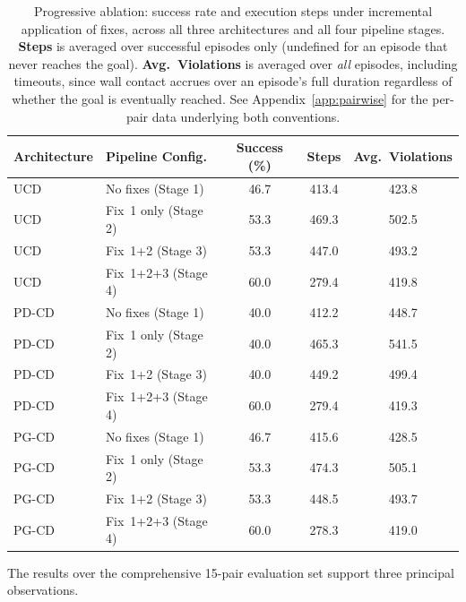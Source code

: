 \documentclass[12pt, a4paper, oneside]{report}
\theoremstyle{definition}
\begin{document}
\begin{table}[H]
\centering
\caption{Progressive ablation: success rate and execution
  steps under incremental application of fixes, across all three
  architectures and all four pipeline stages.
  \textbf{Steps} is averaged over successful episodes only
  (undefined for an episode that never reaches the goal).
  \textbf{Avg.\ Violations} is averaged over \emph{all} episodes,
  including timeouts, since wall contact accrues over an episode's
  full duration regardless of whether the goal is eventually
  reached. See Appendix~\ref{app:pairwise} for the per-pair data
  underlying both conventions.}
\label{tab:ablation_progressive}
\begin{tabular}{@{}llccc@{}}
\toprule
\textbf{Architecture} & \textbf{Pipeline Config.} &
\textbf{Success (\%)} & \textbf{Steps} &
\textbf{Avg.\ Violations} \\
\midrule
UCD   & No fixes (Stage 1)  & 46.7  & 413.4 & 423.8 \\
UCD   & Fix~1 only (Stage 2)& 53.3  & 469.3 & 502.5 \\
UCD   & Fix~1+2 (Stage 3)   & 53.3  & 447.0 & 493.2 \\
UCD   & Fix~1+2+3 (Stage 4) & 60.0  & 279.4 & 419.8 \\
\midrule
PD-CD & No fixes (Stage 1)  & 40.0  & 412.2 & 448.7 \\
PD-CD & Fix~1 only (Stage 2)& 40.0  & 465.3 & 541.5 \\
PD-CD & Fix~1+2 (Stage 3)   & 40.0  & 449.2 & 499.4 \\
PD-CD & Fix~1+2+3 (Stage 4) & 60.0  & 279.4 & 419.3 \\
\midrule
PG-CD & No fixes (Stage 1)& 46.7  & 415.6 & 428.5 \\
PG-CD & Fix~1 only (Stage 2)& 53.3  & 474.3 & 505.1 \\
PG-CD & Fix~1+2 (Stage 3) & 53.3  & 448.5 & 493.7 \\
PG-CD & Fix~1+2+3 (Stage 4)& 60.0  & 278.3 & 419.0 \\
\bottomrule
\end{tabular}
\end{table}

The results over the comprehensive 15-pair evaluation set support three principal observations.
\end{document}
